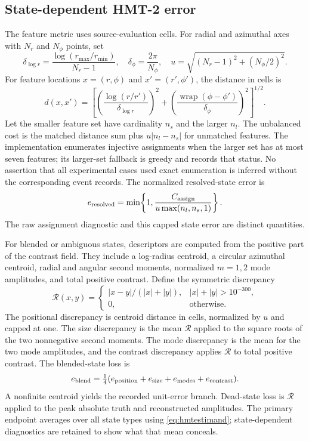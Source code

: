 \subsection{State-dependent HMT-2 error}\label{app:morphloss}
The feature metric uses source-evaluation cells. For radial and azimuthal axes with $N_r$ and $N_\phi$ points, set
\begin{equation}
\delta_{\log r}=\frac{\log(r_{\max}/r_{\min})}{N_r-1},\quad
\delta_\phi=\frac{2\pi}{N_\phi},\quad
u=\sqrt{(N_r-1)^2+(N_\phi/2)^2}.
\end{equation}
For feature locations $x=(r,\phi)$ and $x'=(r',\phi')$, the distance in cells is
\begin{equation}
d(x,x')=\left[\left(\frac{\log(r/r')}{\delta_{\log r}}\right)^2+
\left(\frac{\operatorname{wrap}(\phi-\phi')}{\delta_\phi}\right)^2\right]^{1/2}.
\end{equation}
Let the smaller feature set have cardinality $n_s$ and the larger $n_l$. The unbalanced cost is the matched distance sum plus $u|n_l-n_s|$ for unmatched features. The implementation enumerates injective assignments when the larger set has at most seven features; its larger-set fallback is greedy and records that status. No assertion that all experimental cases used exact enumeration is inferred without the corresponding event records. The normalized resolved-state error is
\begin{equation}
e_{\rm resolved}=\min\!\left\{1,
\frac{C_{\rm assign}}{u\max(n_l,n_s,1)}\right\}.
\end{equation}
The raw assignment diagnostic and this capped state error are distinct quantities.

For blended or ambiguous states, descriptors are computed from the positive part of the contrast field. They include a log-radius centroid, a circular azimuthal centroid, radial and angular second moments, normalized $m=1,2$ mode amplitudes, and total positive contrast. Define the symmetric discrepancy
\begin{equation}
\mathcal R(x,y)=\begin{cases}
|x-y|/(|x|+|y|),&|x|+|y|>10^{-300},\\
0,&\text{otherwise}.
\end{cases}
\end{equation}
The positional discrepancy is centroid distance in cells, normalized by $u$ and capped at one. The size discrepancy is the mean $\mathcal R$ applied to the square roots of the two nonnegative second moments. The mode discrepancy is the mean for the two mode amplitudes, and the contrast discrepancy applies $\mathcal R$ to total positive contrast. The blended-state loss is
\begin{equation}
e_{\rm blend}=\tfrac14(e_{\rm position}+e_{\rm size}+e_{\rm modes}+e_{\rm contrast}).
\end{equation}
A nonfinite centroid yields the recorded unit-error branch. Dead-state loss is $\mathcal R$ applied to the peak absolute truth and reconstructed amplitudes. The primary endpoint averages over all state types using \eqref{eq:hmtestimand}; state-dependent diagnostics are retained to show what that mean conceals.


